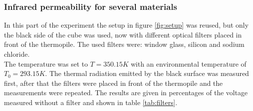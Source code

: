         \subsubsection{Infrared permeability for several materials} \label{sec:Ultrarotdurchlässigkeit}

        In this part of the experiment the setup in figure \ref{fig:setup} was reused, but only the black side of the cube was used, now with 
        different optical filters placed in front of the thermopile. The used filters were: window glass, silicon and sodium chloride. \\
        The temperature was set to $T = 350.15 K$ with an environmental temperature of $T_{0} = 293.15 K$. The thermal radiation emitted by the black surface
        was measured first, after that the filters were placed in front of the thermopile and the measurements were repeated. 
        The results are given in percentages of the voltage measured without a filter and shown in table \ref{tab:filters}.
        
